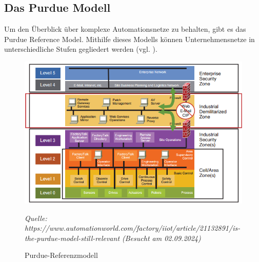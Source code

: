 \subsection{Das Purdue Modell}

Um den Überblick über komplexe Automationsnetze zu behalten, gibt es das Purdue Reference Model. Mithilfe dieses Modells können Unternehmensnetze in unterschiedliche Stufen gegliedert werden (vgl. \cite{sichereIndustrie2}).
\begin{figure}[H]
    \centering
    \includegraphics[width=\textwidth]{images/Purdue_Modell.png} %
    \caption{Purdue-Referenzmodell}
    \label{fig:purdue_modell}
    \vspace{0.5em} %
    \centering
    \textit{Quelle: https://www.automationworld.com/factory/iiot/article/21132891/is-the-purdue-model-still-relevant (Besucht am 02.09.2024)} %
\end{figure}

